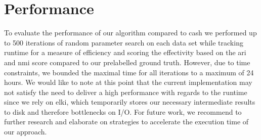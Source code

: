 \begin{figure}
\begin{minipage}[t]{.5\textwidth}
    \label{fig:my_label}
    \end{minipage}%
\end{figure}


\section{Performance}
 To evaluate the performance of our algorithm compared to \gls{cash} we performed up to 500 iterations of random parameter search on each data set while tracking runtime for a measure of efficiency and scoring the effectivity based on the \gls{ari} and \gls{nmi} score compared to our prelabelled ground truth. However, due to time constraints, we bounded the maximal time for all iterations to a maximum of 24 hours.  We would like to note at this point that the current implementation may not satisfy the need to deliver a high performance with regards to the runtime since we rely on \gls{elki}, which temporarily stores our necessary intermediate results to disk and therefore bottlenecks on I/O. For future work, we recommend to further research and elaborate on strategies to accelerate the execution time of our approach. 
 
\begin{table}[hb]
\centering
{}
\caption{}
\label{tab:reducedsetup}
\end{table}
 
